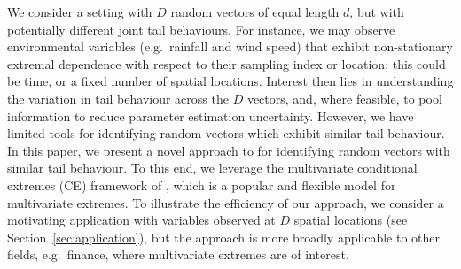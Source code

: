 \documentclass[12pt]{article}
\begin{document}
We consider a setting with $D$ random vectors of equal length $d$, but with potentially different joint tail behaviours. 
For instance, we may observe environmental variables (e.g.\ rainfall and wind speed) that exhibit non-stationary extremal dependence with respect to their sampling index or location; this could be time, or a fixed number of spatial locations. 
Interest then lies in understanding the variation in tail behaviour across the $D$ vectors, and, where feasible, to pool information to reduce parameter estimation uncertainty. 
However, we have limited tools for identifying random vectors which exhibit similar tail behaviour.
In this paper, we present a novel approach to for identifying random vectors with similar tail behaviour.
To this end, we leverage the multivariate conditional extremes (CE) framework of \citet{Heffernan2004}, which is a popular and flexible model for multivariate extremes.
To illustrate the efficiency of our approach, we consider a motivating application with variables observed at $D$ spatial locations (see Section~\ref{sec:application}), but the approach is more broadly applicable to other fields, e.g.\ finance, where multivariate extremes are of interest. 
\end{document}
